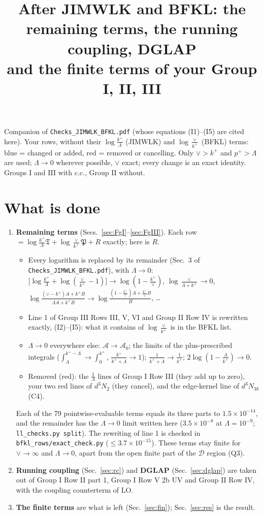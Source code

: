 \documentclass[10pt]{article}
\title{After JIMWLK and BFKL: the remaining terms, the running coupling, DGLAP\\ and the finite terms of your Group I, II, III}
\date{}
\numberwithin{equation}{section}
\newcommand{\new}[1]{{\color{blue}#1}}
\newcommand{\old}[1]{{\color{red}#1}}
\begin{document}
\maketitle
\noindent Companion of \texttt{Checks\_JIMWLK\_BFKL.pdf} (whose equations (I1)--(I5) are cited here). Your rows, without their $\log\frac{k^+}{\Lambda}$ (JIMWLK) and $\log\frac{\vee}{k^+}$ (BFKL) terms: \new{blue} = changed or added, \old{red} = removed or cancelling. Only $\vee>k^+$ and $p^+>\Lambda$ are used; $\Lambda\to0$ wherever possible, $\vee$ exact; every change is an exact identity. Groups I and III with c.c., Group II without.

\section{What is done}\label{sec:what}
\begin{enumerate}
\item \textbf{Remaining terms} (Secs.~\ref{sec:FgI}--\ref{sec:FgIII}). Each row $=\log\frac{k^+}{\Lambda}\mathfrak T+\log\frac{\vee}{k^+}\mathfrak P+R$ exactly; here is $R$.
\begin{itemize}
\item Every logarithm is replaced by its remainder (Sec.~3 of \texttt{Checks\_JIMWLK\_BFKL.pdf}), with $\Lambda\to0$: $\big[\log\frac{k^+}{\Lambda}+\log(\frac{\vee}{k^+}-1)\big]\to\log(1-\frac{k^+}{\vee})$, $\log\frac{\vee}{\Lambda+k^+}\to0$, $\log\frac{(\vee-k^+)A+k^+B}{\Lambda A+k^+B}\to\log\frac{(1-\frac{k^+}{\vee})A+\frac{k^+}{\vee}B}{B}$, \dots
\item Line 1 of Group III Rows III, V, VI and Group II Row IV is rewritten exactly, (I2)--(I5): what it contains of $\log\frac{\vee}{k^+}$ is in the BFKL list.
\item $\Lambda\to0$ everywhere else: $\mathcal A\to\mathcal A_0$; the limits of the plus-prescribed integrals ($\int_\Lambda^{k^+-\Lambda}\to\int_0^{k^+}$, $\frac{k^+}{k^++\Lambda}\to1$); $\frac{1}{k^++\Lambda}\to\frac{1}{k^+}$; $2\log(1-\frac{\Lambda}{k^+})\to0$.
\item Removed (\old{red}): the $\frac{1}{\Lambda}$ lines of Group I Row III (they add up to zero), your two red lines of $d^3N_2$ (they cancel), and the edge-kernel line of $d^3N_{3b}$ (C4).
\end{itemize}
Each of the 79 pointwise-evaluable terms equals its three parts to $1.5\times10^{-14}$, and the remainder has the $\Lambda\to0$ limit written here ($3.5\times10^{-8}$ at $\Lambda=10^{-9}$; \texttt{ll\_checks.py split}). The rewriting of line 1 is checked in \texttt{bfkl\_rows/exact\_check.py} ($\le3.7\times10^{-15}$). These terms stay finite for $\vee\to\infty$ and $\Lambda\to0$, apart from the open finite part of the $\mathcal D$ region (Q3).
\item \textbf{Running coupling} (Sec.~\ref{sec:rc}) and \textbf{DGLAP} (Sec.~\ref{sec:dglap}) are taken out of Group I Row II part 1, Group I Row V 2b UV and Group II Row IV, with the coupling counterterm of LO.
\item \textbf{The finite terms} are what is left (Sec.~\ref{sec:fin}); Sec.~\ref{sec:res} is the result.
\end{enumerate}
\end{document}
